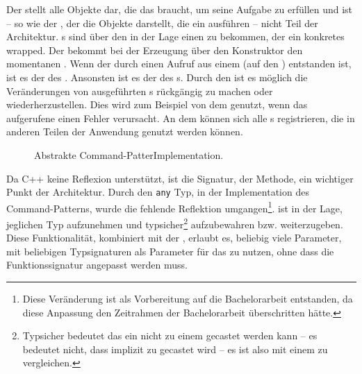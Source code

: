       Der  stellt alle Objekte dar, die das  braucht, um seine Aufgabe zu erfüllen und ist -- so wie der , der die Objekte darstellt, die ein  ausführen -- nicht Teil der Architektur. s sind über den  in der Lage einen  zu bekommen, der ein konkretes  wrapped. Der  bekommt bei der Erzeugung über den Konstruktor den momentanen . Wenn der  durch einen Aufruf aus einem  (auf den ) entstanden ist, ist es der  des . Ansonsten ist es der  des s. Durch den  ist es möglich die Veränderungen von ausgeführten s rückgängig zu machen oder wiederherzustellen. Dies wird zum Beispiel von dem  genutzt, wenn das aufgerufene  einen Fehler verursacht. An dem  können sich alle s registrieren, die in anderen Teilen der Anwendung genutzt werden können.

      \begin{figure}[H]
        \centering
        \caption{Abstrakte Command-PatterImplementation.}
        \label{fig:command_uml}
      \end{figure}

      Da C++ keine Reflexion \autocites{vinoski2005time}{ferber1989computational} unterstützt, ist die Signatur, der  Methode, ein wichtiger Punkt der Architektur. Durch den \texttt{any} \autocite{cpp-fundamentals} Typ, in der Implementation des Command-Patterns, wurde die fehlende Reflektion umgangen\footnote{
         Diese Veränderung ist als Vorbereitung auf die Bachelorarbeit entstanden, da diese Anpassung den Zeitrahmen der Bachelorarbeit überschritten hätte.
      }.  ist in der Lage, jeglichen Typ aufzunehmen und typsicher\footnote{
        Typsicher bedeutet das ein  nicht zu einem  gecastet werden kann -- es bedeutet nicht, dass  implizit zu  gecastet wird -- es ist also mit einem  zu vergleichen.
      } aufzubewahren bzw. weiterzugeben. Diese Funktionalität, kombiniert mit der , erlaubt es, beliebig viele Parameter, mit beliebigen Typsignaturen als Parameter für das  zu nutzen, ohne dass die Funktionssignatur angepasst werden muss.

